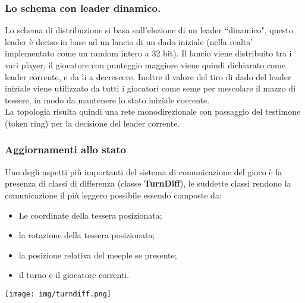 \subsubsection{Lo schema con leader dinamico.}
Lo schema di distribuzione si basa sull'elezione di un leader ``dinamico", questo
leader \`e deciso in base ad un lancio di un dado iniziale (nella realta'
implementato come un random intero a 32 bit). Il
lancio viene distribuito tra i vari player, 
il giocatore con punteggio maggiore viene
quindi dichiarato come leader corrente, e da li a decrescere.
Inoltre il valore del tiro di dado del leader iniziale viene utilizzato da tutti i giocatori come seme per mescolare il mazzo di tessere, in modo da mantenere lo stato iniziale coerente.\\
La topologia risulta quindi una rete monodirezionale con passaggio del
testimone (token ring) per la decisione del leader corrente.


\subsubsection{Aggiornamenti allo stato}
	Uno degli aspetti pi\`u importanti del sistema di comunicazione del gioco
	\`e la presenza di classi di differenza (classe \textbf{TurnDiff}), le
	suddette classi rendono la comunicazione il pi\`u leggero possibile
	essendo composte da:\\

\begin{minipage}{.60\textwidth}
	\begin{itemize}
		\item Le coordinate della tessera posizionata;
		\item la rotazione della tessera posizionata;
		\item la posizione relativa del meeple se presente;
		\item il turno e il giocatore correnti.
	\end{itemize}
\end{minipage}
\begin{minipage}{.20\textwidth}
	\texttt{[image: img/turndiff.png]}
\end{minipage}

